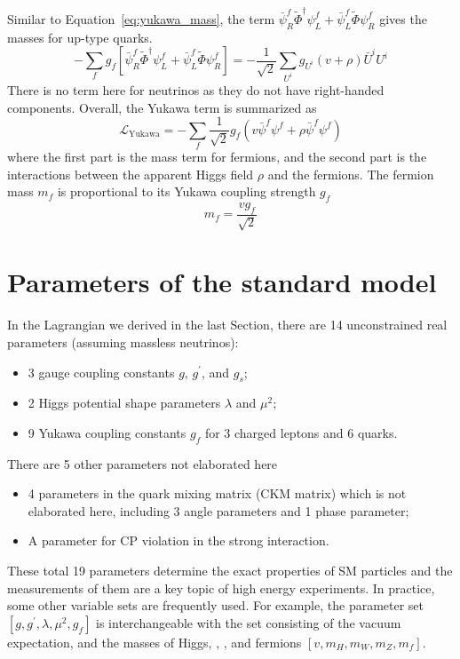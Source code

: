 Similar to Equation~\ref{eq:yukawa_mass}, the term $\bar{\psi}^{f}_{R}\tilde{\Phi}^{\dagger}\psi^{f}_{L} + \bar{\psi}^{f}_{L}\tilde{\Phi}\psi^{f}_{R}$ gives the masses for up-type quarks.
\begin{equation}
    - \sum_{f} g_{f} [\bar{\psi}^{f}_{R}\tilde{\Phi}^{\dagger}\psi^{f}_{L} + \bar{\psi}^{f}_{L}\tilde{\Phi}\psi^{f}_{R}]
    = - \frac{1}{\sqrt{2}} \sum_{U^{i}} g_{U^{i}}  (v+\rho) \bar{U}^{i} U^{i}
\end{equation}
There is no term here for neutrinos as they do not have right-handed components.
Overall, the Yukawa term is summarized as
\begin{equation}\label{eq:Lagrangian_yukawa}
    \mathcal{L}_{\text{Yukawa}} = - \sum_{f} \frac{1}{\sqrt{2}} g_{f} (v\bar{\psi}^{f}\psi^{f} + \rho \bar{\psi}^{f}\psi^{f})
\end{equation}
where the first part is the mass term for fermions, 
and the second part is the interactions between the apparent Higgs field $\rho$ and the fermions.
The fermion mass $m_{f}$ is proportional to its Yukawa coupling strength $g_{f}$
\begin{equation}\label{eq:fermion_mass}
    m_{f} = \frac{vg_{f}}{\sqrt{2}}
\end{equation} 


\section{Parameters of the standard model}\label{sec:SM_parameters}

In the Lagrangian we derived in the last Section, there are 14 unconstrained real parameters (assuming massless neutrinos):
\begin{itemize}
  \item 3 gauge coupling constants $g$, $g^{\prime}$, and $g_{s}$;
  \item 2 Higgs potential shape parameters $\lambda$ and $\mu^{2}$;
  \item 9 Yukawa coupling constants $g_{f}$ for 3 charged leptons and 6 quarks.
\end{itemize}
There are 5 other parameters not elaborated here
\begin{itemize}
  \item 4 parameters in the quark mixing matrix (CKM matrix) which is not elaborated here, including 3 angle parameters and 1 phase parameter;
  \item A parameter for CP violation in the strong interaction.
\end{itemize}
These total 19 parameters determine the exact properties of SM particles and the measurements of them are a key topic of high energy experiments. 
In practice, some other variable sets are frequently used. 
For example, the parameter set $[g, g^{\prime}, \lambda, \mu^{2}, g_{f}]$ is interchangeable with 
the set consisting of the vacuum expectation, and the masses of Higgs, \PW, \PZ, and fermions $[v, m_{H}, m_{W}, m_{Z}, m_{f}]$.


